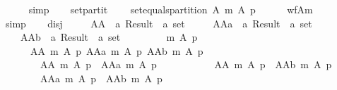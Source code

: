 \begin{isabellebody}
\ \ \ \ \isamarkupfalse%
\ simp\isanewline
\ \ \isamarkupfalse%
\ set{\isacharunderscore}{\kern0pt}partit{\isacharcolon}{\kern0pt}\isanewline
\ \ \ \ {\isachardoublequoteopen}set{\isacharunderscore}{\kern0pt}equals{\isacharunderscore}{\kern0pt}partition\ A\ {\isacharparenleft}{\kern0pt}m\ A\ p{\isacharparenright}{\kern0pt}{\isachardoublequoteclose}\isanewline
\ \ \ \ \isamarkupfalse%
\ wf{\isacharunderscore}{\kern0pt}A{\isacharunderscore}{\kern0pt}m{\isacharunderscore}{\kern0pt}{}\isanewline
\ \ \ \ \isamarkupfalse%
\ simp\isanewline
\ \ \isamarkupfalse%
\ disj{}\ \isamarkupfalse%
\isanewline
\ \ \ \ AA\ {\isacharcolon}{\kern0pt}{\isacharcolon}{\kern0pt}\ {\isachardoublequoteopen}{\isacharprime}{\kern0pt}a\ Result\ {\isasymRightarrow}\ {\isacharprime}{\kern0pt}a\ set{\isachardoublequoteclose}\ \isanewline
\ \ \ \ AAa\ {\isacharcolon}{\kern0pt}{\isacharcolon}{\kern0pt}\ {\isachardoublequoteopen}{\isacharprime}{\kern0pt}a\ Result\ {\isasymRightarrow}\ {\isacharprime}{\kern0pt}a\ set{\isachardoublequoteclose}\ \isanewline
\ \ \ \ AAb\ {\isacharcolon}{\kern0pt}{\isacharcolon}{\kern0pt}\ {\isachardoublequoteopen}{\isacharprime}{\kern0pt}a\ Result\ {\isasymRightarrow}\ {\isacharprime}{\kern0pt}a\ set{\isachardoublequoteclose}\isanewline
\ \ \ \ \isanewline
\ \ \ \ {\isachardoublequoteopen}m\ A\ p\ {\isacharequal}{\kern0pt}\isanewline
\ \ \ \ \ \ {\isacharparenleft}{\kern0pt}AA\ {\isacharparenleft}{\kern0pt}m\ A\ p{\isacharparenright}{\kern0pt}{\isacharcomma}{\kern0pt}\ AAa\ {\isacharparenleft}{\kern0pt}m\ A\ p{\isacharparenright}{\kern0pt}{\isacharcomma}{\kern0pt}\ AAb\ {\isacharparenleft}{\kern0pt}m\ A\ p{\isacharparenright}{\kern0pt}{\isacharparenright}{\kern0pt}\ {\isasymand}\isanewline
\ \ \ \ \ \ \ \ AA\ {\isacharparenleft}{\kern0pt}m\ A\ p{\isacharparenright}{\kern0pt}\ {\isasyminter}\ AAa\ {\isacharparenleft}{\kern0pt}m\ A\ p{\isacharparenright}{\kern0pt}\ {\isacharequal}{\kern0pt}\ {\isacharbraceleft}{\kern0pt}{\isacharbraceright}{\kern0pt}\ {\isasymand}\isanewline
\ \ \ \ \ \ \ \ AA\ {\isacharparenleft}{\kern0pt}m\ A\ p{\isacharparenright}{\kern0pt}\ {\isasyminter}\ AAb\ {\isacharparenleft}{\kern0pt}m\ A\ p{\isacharparenright}{\kern0pt}\ {\isacharequal}{\kern0pt}\ {\isacharbraceleft}{\kern0pt}{\isacharbraceright}{\kern0pt}\ {\isasymand}\isanewline
\ \ \ \ \ \ \ \ AAa\ {\isacharparenleft}{\kern0pt}m\ A\ p{\isacharparenright}{\kern0pt}\ {\isasyminter}\ AAb\ {\isacharparenleft}{\kern0pt}m\ A\ p{\isacharparenright}{\kern0pt}\ {\isacharequal}{\kern0pt}\ {\isacharbraceleft}{\kern0pt}{\isacharbraceright}{\kern0pt}{\isachardoublequoteclose}\isanewline

\end{isabellebody}
